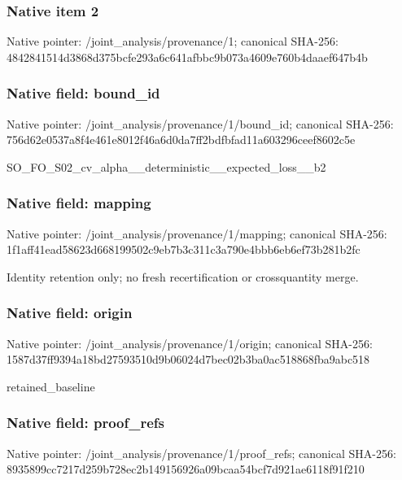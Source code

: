 \documentclass[10pt,a4paper]{article}
\begin{document}
\subsubsection{Native item 2}


Native pointer: /joint\_analysis/provenance/1; canonical SHA-256: 4842841514d3868d375bcfe2\allowbreak{}93a6c641afbbc9b073a4609e\allowbreak{}760b4daaef647b4b



\subsubsection{Native field: bound\_id}


Native pointer: /joint\_analysis/provenance/1/bound\_id; canonical SHA-256: 756d62e0537a8f4e461e8012\allowbreak{}f46a6d0da7ff2bdfbfad11a6\allowbreak{}03296ceef8602c5e


SO\_FO\_S02\_cv\_alpha\_\_dete\allowbreak{}rministic\_\_expected\_loss\allowbreak{}\_\_b2


\subsubsection{Native field: mapping}


Native pointer: /joint\_analysis/provenance/1/mapping; canonical SHA-256: 1f1aff41ead58623d6681995\allowbreak{}02c9eb7b3c311c3a790e4bbb\allowbreak{}6eb6ef73b281b2fc


Identity retention only; no fresh recertification or crossquantity merge.


\subsubsection{Native field: origin}


Native pointer: /joint\_analysis/provenance/1/origin; canonical SHA-256: 1587d37ff9394a18bd275935\allowbreak{}10d9b06024d7bec02b3ba0ac\allowbreak{}518868fba9abc518


retained\_baseline


\subsubsection{Native field: proof\_refs}


Native pointer: /joint\_analysis/provenance/1/proof\_refs; canonical SHA-256: 8935899cc7217d259b728ec2\allowbreak{}b149156926a09bcaa54bcf7d\allowbreak{}921ae6118f91f210
\end{document}
